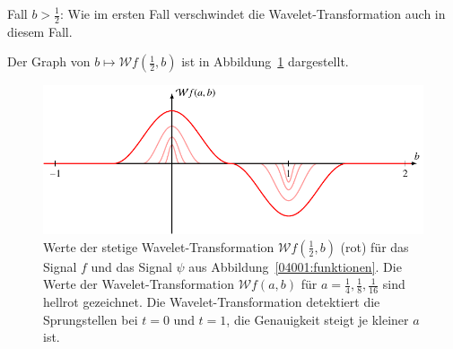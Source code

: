 \begin{loesung}
\begin{teilaufgaben}
\begin{enumerate}
Fall $b > \frac12$:
Wie im ersten Fall verschwindet die Wavelet-Transformation auch in diesem
Fall.
\end{enumerate}
Der Graph von $b\mapsto \mathcal{W}f(\frac12,b)$ ist in
Abbildung~\ref{04001:wavelet2} dargestellt.
\begin{figure}
\centering
%
%
\includegraphics{uebungsaufgaben/04001-W.pdf}
\caption{Werte der stetige Wavelet-Transformation $\mathcal{W}f(\frac12,b)$
(rot)
für das Signal $f$ und das Signal $\psi$ aus Abbildung~\ref{04001:funktionen}.
Die Werte der Wavelet-Transformation $\mathcal{W}f(a,b)$ für
$a=\frac14,\frac18,\frac1{16}$ sind hellrot gezeichnet.
Die Wavelet-Transformation detektiert die Sprungstellen bei $t=0$ und
$t=1$, die Genauigkeit steigt je kleiner $a$ ist.
\label{04001:wavelet2}}
\end{figure}
%

\end{teilaufgaben}
\end{loesung}
